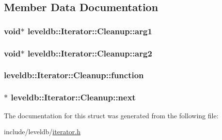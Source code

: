 \subsection{Member Data Documentation}
\hypertarget{structleveldb_1_1_iterator_1_1_cleanup_a4f60a8f4786f1d8fbcf5b2039c8e39bc}{
\subsubsection[{arg1}]{\setlength{\rightskip}{0pt plus 5cm}void$\ast$ leveldb\-::\-Iterator\-::\-Cleanup\-::arg1}}\label{structleveldb_1_1_iterator_1_1_cleanup_a4f60a8f4786f1d8fbcf5b2039c8e39bc}
\hypertarget{structleveldb_1_1_iterator_1_1_cleanup_a957ccaa98c380048c59658542e419e89}{
\subsubsection[{arg2}]{\setlength{\rightskip}{0pt plus 5cm}void$\ast$ leveldb\-::\-Iterator\-::\-Cleanup\-::arg2}}\label{structleveldb_1_1_iterator_1_1_cleanup_a957ccaa98c380048c59658542e419e89}
\hypertarget{structleveldb_1_1_iterator_1_1_cleanup_aa8a4f34ac312e21d83db4457bba40301}{
\subsubsection[{function}]{ leveldb\-::\-Iterator\-::\-Cleanup\-::function}}\label{structleveldb_1_1_iterator_1_1_cleanup_aa8a4f34ac312e21d83db4457bba40301}
\hypertarget{structleveldb_1_1_iterator_1_1_cleanup_a9dea82023286b2ff15a1657bc22ed63c}{
\subsubsection[{next}]{$\ast$ leveldb\-::\-Iterator\-::\-Cleanup\-::next}}\label{structleveldb_1_1_iterator_1_1_cleanup_a9dea82023286b2ff15a1657bc22ed63c}


The documentation for this struct was generated from the following file\-:\begin{DoxyCompactItemize}
\item 
include/leveldb/\hyperlink{iterator_8h}{iterator.\-h}\end{DoxyCompactItemize}
